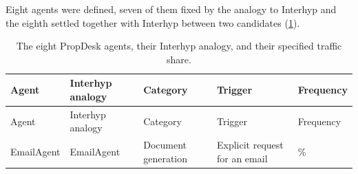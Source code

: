 Eight agents were defined, seven of them fixed by the analogy to Interhyp and the eighth settled together with Interhyp between two candidates (\cref{tbl:propdesk-agents}).

\begingroup\footnotesize
\begin{longtable}[]{@{}
  >{\raggedright\arraybackslash}p{}
  >{\raggedright\arraybackslash}p{}
  >{\raggedright\arraybackslash}p{}
  >{\raggedright\arraybackslash}p{}
  >{\raggedright\arraybackslash}p{}@{}}
\caption{The eight PropDesk agents, their Interhyp analogy, and their specified traffic share.}\label{tbl:propdesk-agents}\tabularnewline
\toprule\noalign{}
\begin{minipage}[b]{\linewidth}\raggedright
Agent
\end{minipage} & \begin{minipage}[b]{\linewidth}\raggedright
Interhyp analogy
\end{minipage} & \begin{minipage}[b]{\linewidth}\raggedright
Category
\end{minipage} & \begin{minipage}[b]{\linewidth}\raggedright
Trigger
\end{minipage} & \begin{minipage}[b]{\linewidth}\raggedright
Frequency
\end{minipage} \\
\midrule\noalign{}
\endfirsthead
\toprule\noalign{}
\begin{minipage}[b]{\linewidth}\raggedright
Agent
\end{minipage} & \begin{minipage}[b]{\linewidth}\raggedright
Interhyp analogy
\end{minipage} & \begin{minipage}[b]{\linewidth}\raggedright
Category
\end{minipage} & \begin{minipage}[b]{\linewidth}\raggedright
Trigger
\end{minipage} & \begin{minipage}[b]{\linewidth}\raggedright
Frequency
\end{minipage} \\
\midrule\noalign{}
\endhead
\bottomrule\noalign{}
\endlastfoot
EmailAgent & EmailAgent & Document generation & Explicit request for an email & 50\% \\

\end{longtable}
